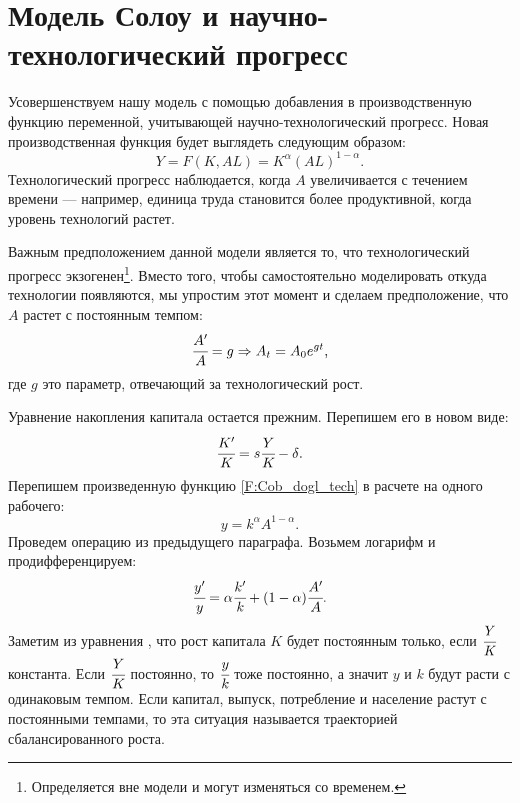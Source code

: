 \section{Модель Солоу и научно-технологический прогресс}

Усовершенствуем нашу модель с помощью добавления в производственную функцию переменной, учитывающей научно-технологический прогресс.
Новая производственная функция будет выглядеть следующим образом:
\begin{equation}
	Y=F(K,AL)=K^{\alpha}(AL)^{1 - \alpha}\text{.}
\end{equation}\label{F:Cob_dogl_tech}
Технологический прогресс наблюдается, когда $A$ увеличивается с течением времени --- например, единица труда становится более продуктивной, когда уровень технологий растет.

Важным предположением данной модели является то, что технологический прогресс экзогенен\footnote{Определяется вне модели и могут изменяться со временем.}.
Вместо того, чтобы самостоятельно моделировать откуда технологии появляются, мы упростим этот момент и сделаем предположение, что $A$ растет с постоянным темпом:
\begin{equation*}
	\cfrac{A'}{A} = g \Rightarrow A_{t} = A_{0} e^{gt}\text{,}
\end{equation*}
где $g$ это параметр, отвечающий за технологический рост.

Уравнение накопления капитала остается прежним. Перепишем его в новом виде:
\begin{equation}
\cfrac{K'}{K} = s \cfrac{Y}{K} - \delta\text{.}
\end{equation}\label{F:capital_solow_tech}
Перепишем произведенную функцию \ref{F:Cob_dogl_tech} в расчете на одного рабочего:
\begin{equation*}
y=k^{\alpha}A^{1 - \alpha}\text{.}
\end{equation*}
Проведем операцию из предыдущего параграфа.
Возьмем логарифм и продифференцируем:
\begin{equation}
\cfrac{y'}{y} = \alpha \cfrac{k'}{k} + (1 - \alpha) \cfrac{A'}{A}\text{.}
\label{F:cob_dogl_per_person_tech}
\end{equation}
Заметим из уравнения \label{F:capital_solow_tech}, что рост капитала $K$ будет постоянным только, если $\cfrac{Y}{K}$ константа.
Если $\cfrac{Y}{K}$ постоянно, то $\cfrac{y}{k}$ тоже постоянно, а значит $y$ и $k$ будут расти с одинаковым темпом.
Если капитал, выпуск, потребление и население растут с постоянными темпами, то эта ситуация называется траекторией сбалансированного роста.

